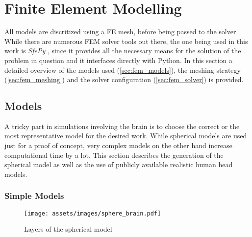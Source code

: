 \pagebreak
\chapter{Finite Element Modelling}

All models are discritized using a \gls{FE} mesh, before being passed to the solver. While there are numerous \gls{FEM} solver tools out there, the one being used in this work is \textit{SfePy} \cite{Cimrman2019}, since it provides all the necessary means for the solution of the problem in question and it interfaces directly with Python. In this section a detailed overview of the models used (\autoref{sec:fem_models}), the meshing strategy (\autoref{sec:fem_meshing}) and the solver configuration (\autoref{sec:fem_solver}) is provided.

\section{Models}
\label{sec:fem_models}

A tricky part in simulations involving the brain is to choose the correct or the most representative model for the desired work. While spherical models are used just for a proof of concept, very complex models on the other hand increase computational time by a lot. This section describes the generation of the spherical model as well as the use of publicly available realistic human head models.

\subsection{Simple Models}
\begin{wrapfigure}{r}{0.35\textwidth}
    \centering
    \texttt{[image: assets/images/sphere\_brain.pdf]}
    \caption{Layers of the spherical model}
    \vspace{-4cm}
    \label{fig:sphere_brain}
\end{wrapfigure}

